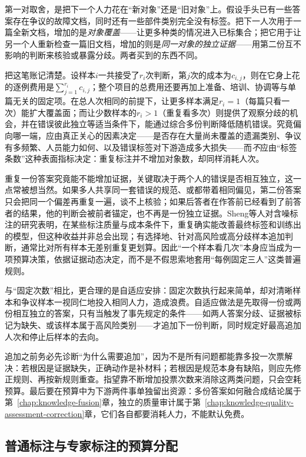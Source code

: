 第一对取舍，是把下一个人力花在“新对象”还是“旧对象”上。假设手头已有一些答案存在争议的故障文档，同时还有一些部件类别完全没有标签。把下一人次用于一篇全新文档，增加的是\emph{对象覆盖}——让更多种类的情况进入已标集合；把它用于让另一个人重新检查一篇旧文档，增加的则是\emph{同一对象的独立证据}——用第二份互不影响的判断来核验或暴露分歧。两者买到的东西不同。

把这笔账记清楚。设样本$i$一共接受了$r_i$次判断，第$j$次的成本为$c_{i,j}$，则在它身上花的逐例费用是$\sum_{j=1}^{r_i}c_{i,j}$；整个项目的总费用还要再加上准备、培训、协调等与单篇无关的固定项。在总人次相同的前提下，让更多样本满足$r_i=1$（每篇只看一次）能扩大覆盖面；而让少数样本的$r_i>1$（重复看多次）则提供了观察分歧的机会，并在错误彼此独立等适当条件下，能通过综合多份判断降低随机错误。究竟偏向哪一端，应由真正关心的因素决定——是否存在大量尚未覆盖的遗漏类别、争议有多频繁、人员能力如何、以及错误标签对下游造成多大损失——而\emph{不}应由“标签条数”这种表面指标决定：重复标注并不增加对象数，却同样消耗人次。

\Needspace{65mm}
重复一份答案究竟能不能增加证据，关键取决于两个人的错误是否相互独立，这一点常被想当然。如果多人共享同一套错误的规范、或都带着相同偏见，第二份答案只会把同一个偏差再重复一遍，谈不上核验；如果后答者在作答前已经看到了前答者的结果，他的判断会被前者锚定，也不再是一份独立证据。Sheng等人对含噪标注的研究表明，在某些标注质量与成本条件下，重复确实能改善最终标签和训练出的模型，但这种收益并非总会出现；有选择地、针对高风险或高分歧样本追加判断，通常比对所有样本无差别重复更划算。因此“一个样本看几次”本身应当成为一项预算决策，依据证据动态决定，而不是不假思索地套用“每例固定三人”这类普遍规则。

与“固定次数”相比，更合理的是自适应安排：固定次数执行起来简单，却对清晰样本和争议样本一视同仁地投入相同人力，造成浪费。自适应做法是先取得一份或两份相互独立的答案，只有当触发了事先规定的条件——如两人答案分歧、证据被标记为缺失、或该样本属于高风险类别——才追加下一份判断，同时规定好最高追加人次和停止后样本的去向。

追加之前务必先诊断“为什么需要追加”，因为不是所有问题都能靠多投一次票解决：若根因是证据缺失，正确动作是补材料；若根因是规范本身有缺陷，则应先修正规则、再按新规则重查。指望靠不断增加投票次数来消除这两类问题，只会空耗预算。最后要在预算中为下游两件事单独留出资源：多份答案如何融合成结论属于第~\ref{chap:knowledge-fusion}章，独立的质量审计属于第~\ref{chap:knowledge-quality-assessment-correction}章，它们各自都要消耗人力，不能默认免费。

\subsection{普通标注与专家标注的预算分配}
\label{sec:knowledge-acquisition-human-generalist-versus-expert}

